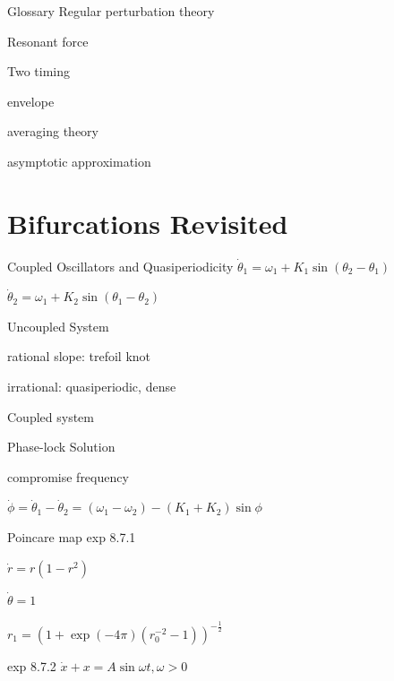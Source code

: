 \documentclass[9pt,aspectratio=43,mathserif,table]{beamer}
\begin{document}
\begin{frame}[label=current]{Glossary}
Regular perturbation theory

Resonant force

Two timing

envelope

averaging theory

asymptotic approximation

\end{frame}

\section{Bifurcations Revisited}
\begin{frame}[label=current]{Coupled Oscillators and Quasiperiodicity}
  $\dot \theta_1 = \omega_1 + K_1 \sin(\theta_2 - \theta_1)$

  $\dot \theta_2 = \omega_1 + K_2 \sin(\theta_1 - \theta_2)$

  \medskip

  Uncoupled System

    \quad rational slope: trefoil knot

    \quad irrational: quasiperiodic, dense

   \medskip

  Coupled system
     
    \quad Phase-lock Solution

    \quad compromise frequency

  $\dot \phi = \dot\theta_1 - \dot \theta_2 = (\omega_1 - \omega_2) - (K_1 + K_2) \sin\phi$

    
\end{frame}

\begin{frame}[label=current]{Poincare map}
exp 8.7.1 

    $\dot r = r(1-r^2)$

    $\dot \theta = 1$


    $r_1 = (1 + \exp(-4\pi)(r_0^{-2} - 1))^{-\frac{ 1}{2}}$

   \medskip

exp 8.7.2 
    $\dot x + x = A\sin\omega t, \omega >0$
\end{frame}
\end{document}
